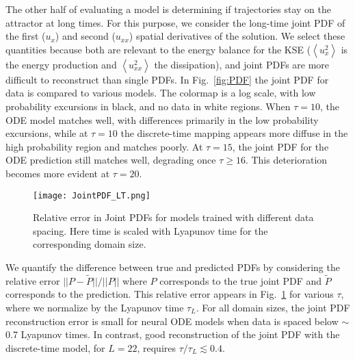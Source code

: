 \documentclass[preprint,aps,pre,letterpaper,onecolumn,superscriptaddress]{revtex4-2} %
\begin{document}
The other half of evaluating a model is determining if trajectories stay on the attractor at long times. For this purpose, we consider the long-time joint PDF of the first ($u_x$) and second ($u_{xx}$) spatial derivatives of the solution. We select these quantities because both are relevant to the energy balance for the KSE ($\left<u_x^2\right>$ is the energy production and $\left<u_{xx}^2\right>$ the dissipation), and joint PDFs are more difficult to reconstruct than single PDFs. %
 In Fig.\ \ref{fig:PDF} the joint PDF for data is compared to various models. The colormap is a log scale, with low probability excursions in black, and no data in white regions. When $\tau=10$, the ODE model matches well, with differences primarily in the low probability excursions, while at $\tau=10$ the discrete-time mapping appears more diffuse in the high probability region and matches poorly. At $\tau=15$, the joint PDF for the ODE prediction still matches well, degrading once $\tau\geq 16$. This deterioration becomes more evident at $\tau=20$.


\begin{figure} 
	\texttt{[image: JointPDF\_LT.png]}
	\caption{Relative error in Joint PDFs for models trained with different data spacing. Here time is scaled with Lyapunov time for the corresponding domain size.}
	\label{fig:JointPDFError_Temp}
\end{figure} 


We quantify the difference between true and predicted PDFs by considering the relative error $||P-\tilde{P}||/||P||$ where $P$ corresponds to the true joint PDF and $\tilde{P}$ corresponds to the prediction. This relative error appears in Fig.\ \ref{fig:JointPDFError_Temp} for various $\tau$, where we normalize by the Lyapunov time $\tau_L$. For all domain sizes, the joint PDF reconstruction error is small for neural ODE models when data is spaced below $\sim$0.7 Lyapunov times. In contrast, good reconstruction of the joint PDF with the discrete-time model, for $L=22$, requires $\tau/\tau_L\lesssim 0.4$.
\end{document}
